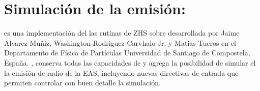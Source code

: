 \section{Simulaci\'on de la emisi\'on: \zhs{}}
\label{sc:simRadio}
% 	
% 	

	\zhs{} es una implementaci\'on del las rutinas de ZHS \cite{1_halzen_zas_stanev_1991,2_zas_halzen_stanev_1992} sobre \aires{} desarrollada por Jaime Alvarez-Muñiz, Washington Rodriguez-Carvhalo Jr. y Matias Tueros en el Departamento de Física de Partículas Universidad de Santiago de Compostela, España.
	\zhs{}, conserva todas las capacidades de \aires{} y agrega la posibilidad de simular el la emisi\'on de radio de la EAS, incluyendo nuevas directivas de entrada que permiten controlar con buen detalle la simulación.
	
